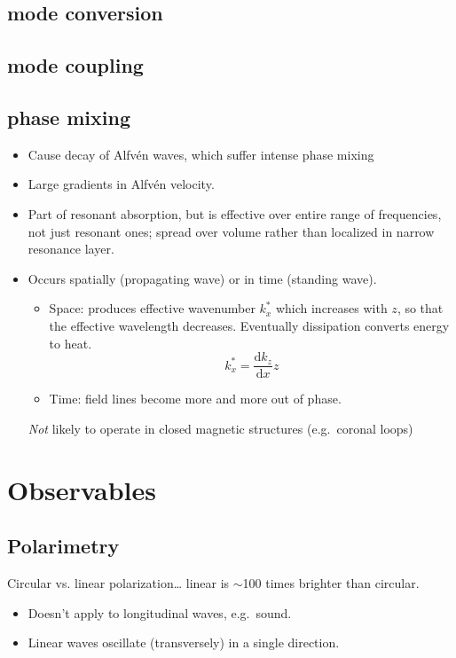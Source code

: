 \documentclass{article}
\begin{document}
\subsection{mode conversion}
\subsection{mode coupling}
\subsection{phase mixing}
\begin{itemize}
    \item Cause decay of Alfv\'en waves, which suffer intense phase mixing
    \item Large gradients in Alfv\'{e}n velocity.
    \item Part of resonant absorption, but is effective over entire range of frequencies,
        not just resonant ones; spread over volume rather than localized in
        narrow resonance layer.
    \item Occurs spatially (propagating wave) or in time (standing wave).
        \begin{itemize}
            \item Space: produces effective wavenumber $k_{x}^{*}$ which increases
                with $z$, so that the effective wavelength decreases. Eventually
                dissipation converts energy to heat.
                \[
                    k_{x}^{*} = \frac{\mathrm{d}k_{z}}{\mathrm{d}x}z
                    \]
            \item Time: field lines become more and more out of phase.
        \end{itemize}
        \emph{Not} likely to operate in closed magnetic structures
        (e.g.\ coronal loops)
\end{itemize}


\section{Observables}

\subsection{Polarimetry}

Circular vs. linear polarization\ldots
linear is $\sim$100 times brighter than circular.
\begin{itemize}
    \item Doesn't apply to longitudinal waves, e.g.\ sound.
    \item Linear waves oscillate (transversely) in a single direction.
\end{itemize}
\end{document}
